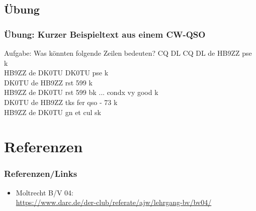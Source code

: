 \subsection*{Übung}
\begin{frame}
  \frametitle{Übung: Kurzer Beispieltext aus einem CW-QSO}

  \begin{exampleblock}{Aufgabe: Was könnten folgende Zeilen bedeuten?}
    CQ DL CQ DL de HB9ZZ pse k \\
    HB9ZZ de DK0TU DK0TU pse k \\
    DK0TU de HB9ZZ rst 599 k\\
    HB9ZZ de DK0TU rst 599 bk ... condx vy good k \\
    DK0TU de HB9ZZ tks fer qso - 73 k \\
    HB9ZZ de DK0TU gn et cul sk \\
  \end{exampleblock}

\end{frame}

\section*{Referenzen}

\begin{frame}
  \frametitle{Referenzen/Links}

  \footnotesize
  \begin{itemize}
    \item Moltrecht B/V 04: \\
      \url{https://www.darc.de/der-club/referate/ajw/lehrgang-bv/bv04/}
  \end{itemize}

\end{frame}


